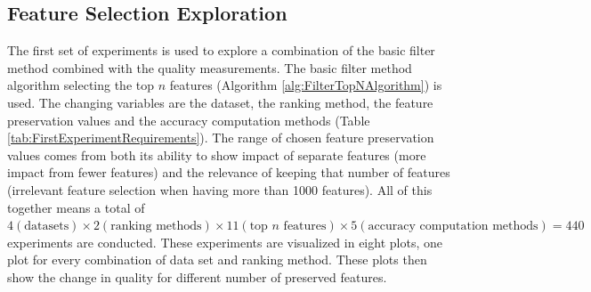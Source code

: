 \documentclass[10pt,a4paper]{article}
\begin{document}
	\subsection{Feature Selection Exploration}
	\label{subsec:FeatureSelectionExploration}
	
	The first set of experiments is used to explore a combination of the basic filter method combined with the quality measurements. The basic filter method algorithm selecting the top $n$ features (Algorithm \ref{alg:FilterTopNAlgorithm}) is used. The changing variables are the dataset, the ranking method, the feature preservation values and the accuracy computation methods (Table \ref{tab:FirstExperimentRequirements}). The range of chosen feature preservation values comes from both its ability to show impact of separate features (more impact from fewer features) and the relevance of keeping that number of features (irrelevant feature selection when having more than 1000 features). All of this together means a total of $4 (\text{datasets}) \times 2 (\text{ranking methods}) \times 11 (\text{top } n \text{ features}) \times 5 (\text{accuracy computation methods}) = 440$ experiments are conducted. These experiments are visualized in eight plots, one plot for every combination of data set and ranking method. These plots then show the change in quality for different number of preserved features.
	
\end{document}
